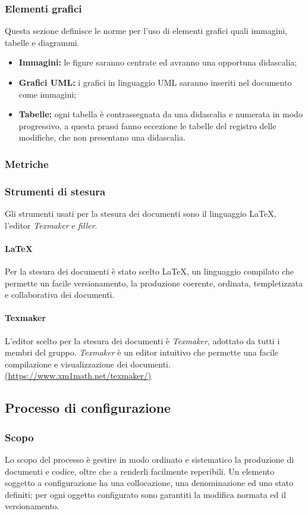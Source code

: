 \subsubsection{Elementi grafici}
Questa sezione definisce le norme per l'uso di elementi grafici quali immagini, tabelle e diagrammi.
\begin{itemize}
\item \textbf{Immagini:} le figure saranno centrate ed avranno una opportuna didascalia;
\item \textbf{Grafici UML:} i grafici in linguaggio UML saranno inseriti nel documento come immagini;
\item \textbf{Tabelle:} ogni tabella è contrassegnata da una didascalia e numerata in modo progressivo, a questa prassi fanno eccezione le tabelle del registro delle modifiche, che non presentano una didascalia.
\end{itemize}
\subsubsection{Metriche}
\subsubsection{Strumenti di stesura}
Gli strumenti usati per la stesura dei documenti sono il linguaggio \LaTeX, l'editor \textit{Texmaker} e \textit{filler}.
\paragraph{\LaTeX}
Per la stesura dei documenti è stato scelto \LaTeX, un linguaggio compilato che permette un facile versionamento, la produzione coerente, ordinata, templetizzata e collaborativa dei documenti.
\paragraph{Texmaker}
L'editor scelto per la stesura dei documenti è \textit{Texmaker}, adottato da tutti i membri del gruppo. \textit{Texmaker} è un editor intuitivo che permette una facile compilazione e visualizzazione dei documenti.\newline
\url{(https://www.xm1math.net/texmaker/)}
\subsection{Processo di configurazione}
\subsubsection{Scopo}
Lo scopo del processo è gestire in modo ordinato e sistematico la produzione di documenti e codice, oltre che a renderli facilmente reperibili. Un elemento soggetto a configurazione ha una collocazione, una denominazione ed uno stato definiti; per ogni oggetto configurato sono garantiti la modifica normata ed il versionamento.
